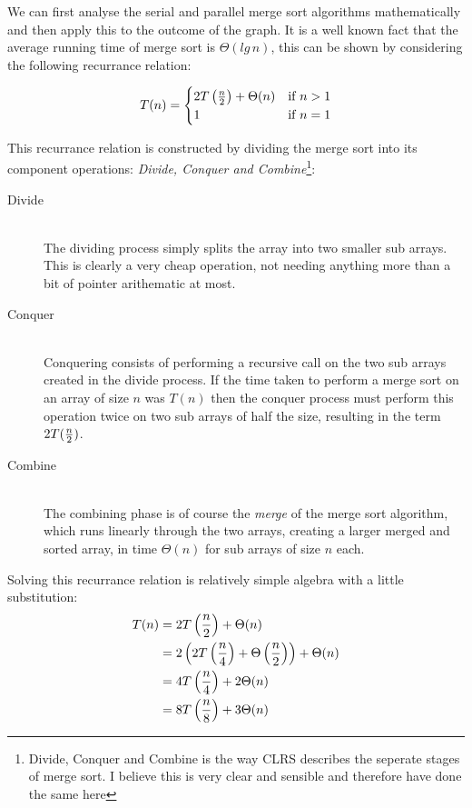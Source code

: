 \documentclass[12pt,twoside,notitlepage]{report}
\begin{document}
We can first analyse the serial and parallel merge sort algorithms mathematically and then apply this to the outcome of the graph. It is a well known fact that the average running time of merge sort is $\Theta(lg\,{n})$, this can be
shown by considering the following recurrance relation:

\[
T(n) = 
    \begin{cases}
    2T\left({n \over 2}\right) + \Theta(n) & \text{if } n > 1 \\
    1 & \text{if } n = 1
    \end{cases}
\]

This recurrance relation is constructed by dividing the merge sort into its component operations: {\em Divide, Conquer and Combine}\footnote{Divide, Conquer and Combine is the way CLRS describes the seperate stages of merge sort. I
believe this is very clear and sensible and therefore have done the same here}:

\begin{description}

\item[Divide] \hfill \\
The dividing process simply splits the array into two smaller sub arrays. This is clearly a very cheap operation, not needing anything more than a bit of pointer arithematic at most.

\item[Conquer] \hfill \\
Conquering consists of performing a recursive call on the two sub arrays created in the divide process. If the time taken to perform a merge sort on an array of size $n$ was $T(n)$ then the conquer process must perform this operation
twice on two sub arrays of half the size, resulting in the term $2T({n \over 2})$.

\item[Combine] \hfill \\
The combining phase is of course the {\em merge} of the merge sort algorithm, which runs linearly through the two arrays, creating a larger merged and sorted array, in time $\Theta(n)$ for sub arrays of size $n$ each.

\end{description}

Solving this recurrance relation is relatively simple algebra with a little substitution:
\begin{align*}
T(n) &= 2T\left({n \over 2}\right) + \Theta(n) \\
&= 2\left(2T\left({n \over 4}\right) + \Theta\left({n \over 2}\right)\right) + \Theta(n) \\
&= 4T\left({n \over 4}\right) + 2\Theta(n) \\
&= 8T\left({n \over 8}\right) + 3\Theta(n) \\
\end{align*}
\end{document}
